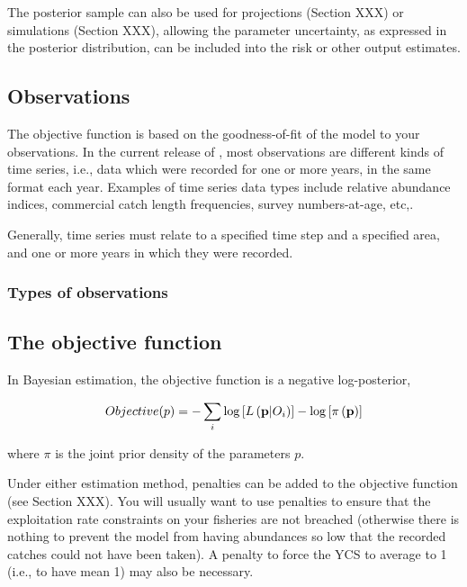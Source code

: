 The posterior sample can also be used for projections (Section XXX) or simulations (Section XXX), allowing the parameter uncertainty, as expressed in the posterior distribution, can be included into the risk or other output estimates.

\subsection{Observations}

The objective function is based on the goodness-of-fit of the model to your observations. In the current release of \SPM, most observations are different kinds of time series, i.e., data which were recorded for one or more years, in the same format each year. Examples of time series data types include relative abundance indices, commercial catch length frequencies, survey numbers-at-age, etc,. 

Generally, time series must relate to a specified time step and a specified area, and one or more years in which they were recorded.

\subsubsection{Types of observations}

\subsection{The objective function}

In Bayesian estimation, the objective function is a negative log-posterior,

\[
Objective(p)= - \sum\limits_i {\log \left[ {L\left( {{\bf{p}}|O_i } \right)} \right]}  - \log \left[ {\pi \left( {\bf{p}} \right)} \right]
\]

where $\pi$ is the joint prior density of the parameters $p$.

Under either estimation method, penalties can be added to the objective function (see Section XXX). You will usually want to use penalties to ensure that the exploitation rate constraints on your fisheries are not breached (otherwise there is nothing to prevent the model from having abundances so low that the recorded catches could not have been taken). A penalty to force the YCS to average to 1 (i.e., to have mean 1) may also be necessary.

